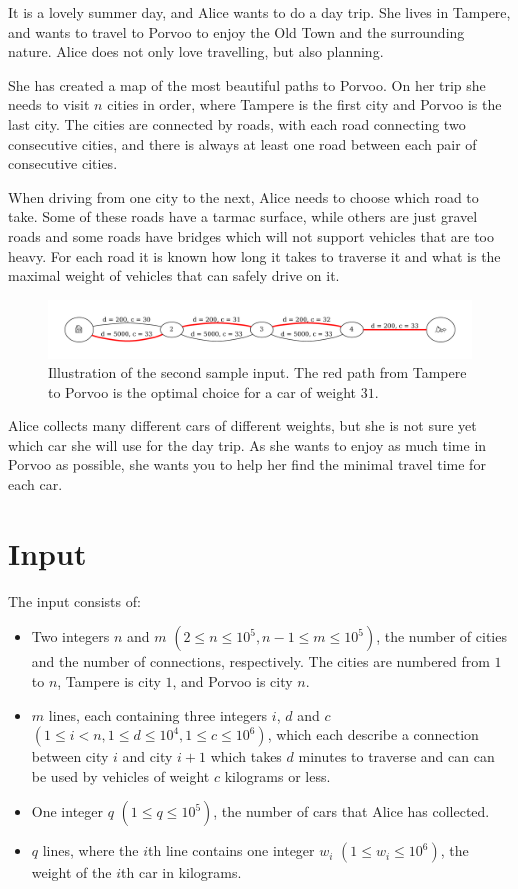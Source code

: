 
It is a lovely summer day, and Alice wants to do a day trip. She lives in
Tampere, and wants to travel to Porvoo to enjoy the Old Town and the surrounding
nature. Alice does not only love travelling, but also planning.

She has created a map of the most beautiful paths to Porvoo. On her trip she
needs to visit $n$ cities in order, where Tampere is the first city and Porvoo
is the last city. The cities are connected by roads, with each road connecting
two consecutive cities, and there is always at least one road between each pair
of consecutive cities.

When driving from one city to the next, Alice needs to choose which road to take.
Some of these roads have a tarmac surface, while others are just gravel roads
and some roads have bridges which will not support vehicles that are too heavy.
For each road it is known how long it takes to traverse it and what is the
maximal weight of vehicles that can safely drive on it.

\begin{figure}[!h]
  \centering
  \includegraphics[width=1\textwidth]{sample2}
	\caption{Illustration of the second sample input. The red path from Tampere
	to Porvoo is the optimal choice for a car of weight $31$.}
\end{figure}

Alice collects many different cars of different weights,
but she is not sure yet which car she will use for the day trip.
As she wants to enjoy as much time in Porvoo as possible, she wants you to help
her find the minimal travel time for each car.

\section*{Input}
The input consists of:
\begin{itemize}
	\item Two integers $n$ and $m$ $(2 \leq n \leq 10^5, n - 1 \leq m \leq 10^5)$,
		the number of cities and the number of connections, respectively.
    The cities are numbered from $1$ to $n$, Tampere is city $1$, and Porvoo is city $n$.
	\item $m$ lines, each containing three integers $i$, $d$ and $c$ $(1 \leq i < n, 1
		\leq d \leq 10^4, 1 \leq c \leq 10^6)$, which each describe a connection
    between city $i$ and city $i + 1$ which takes $d$ minutes to traverse and
    can can be used by vehicles of weight $c$ kilograms or less.
	\item One integer $q$ $(1 \leq q \leq 10^5)$, the number of cars that Alice
		has collected.
	\item $q$ lines, where the $i$th line contains one integer $w_i$ $(1 \leq
		w_i \leq 10^6)$, the weight of the $i$th car in kilograms.
\end{itemize}

